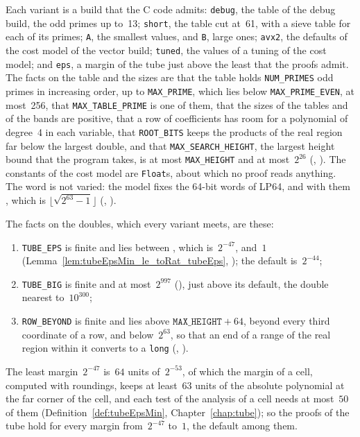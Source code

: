Each variant is a build that the C code admits: \verb|debug|, the table of the debug build, the odd
primes up to~13; \verb|short|, the table cut at~61, with a sieve table for each of its primes;
\verb|A|, the smallest values, and \verb|B|, large ones; \verb|avx2|, the defaults of the cost model
of the vector build; \verb|tuned|, the values of a tuning of the cost model; and \verb|eps|, a
margin of the tube just above the least that the proofs admit. The facts on the table and the sizes
are that the table holds \verb|NUM_PRIMES| odd primes in increasing order, up to \verb|MAX_PRIME|,
which lies below \verb|MAX_PRIME_EVEN|, at most~256, that \verb|MAX_TABLE_PRIME| is one of them,
that the sizes of the tables and of the bands are positive, that a row of coefficients has room for
a polynomial of degree~4 in each variable, that \verb|ROOT_BITS| keeps the products of the real
region far below the largest double, and that \verb|MAX_SEARCH_HEIGHT|, the largest height bound
that the program takes, is at most \verb|MAX_HEIGHT| and at most~$2^{26}$
(, ).
The constants of the cost model are \verb|Float|s, about which no proof reads anything. The word is
not varied: the model fixes the 64-bit words of LP64, and with them , which
is $\lfloor\sqrt{2^{63} - 1}\rfloor$ (,
).

The facts on the doubles, which every variant meets, are these:
\begin{enumerate}
  \item \verb|TUBE_EPS| is finite and lies between , which is~$2^{-47}$,
    and~$1$ (Lemma~\ref{lem:tubeEpsMin_le_toRat_tubeEps}, );
    the default is~$2^{-44}$;
  \item \verb|TUBE_BIG| is finite and at most~$2^{997}$ (), just
    above its default, the double nearest to~$10^{300}$;
  \item \verb|ROW_BEYOND| is finite and lies above $\mathtt{MAX\_HEIGHT} + 64$, beyond every third
    coordinate of a row, and below~$2^{63}$, so that an end of a range of the real region within it
    converts to a \verb|long| (,
    ).
\end{enumerate}
The least margin~$2^{-47}$ is~$64$ units of~$2^{-53}$, of which the margin of a cell, computed with
roundings, keeps at least~$63$ units of the absolute polynomial at the far corner of the cell, and
each test of the analysis of a cell needs at most~$50$ of them (Definition~\ref{def:tubeEpsMin},
Chapter~\ref{chap:tube}); so the proofs of the tube hold for every margin from~$2^{-47}$ to~$1$, the
default among them.

